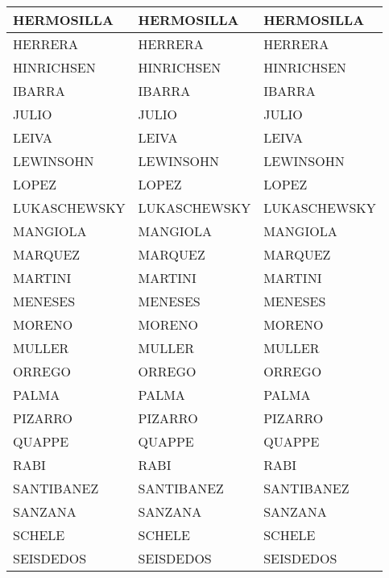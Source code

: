 \begin{table}[h]
\begin{tabular}{|l|l|l|}
HERMOSILLA           &HERMOSILLA          &HERMOSILLA          \\ \hline
HERRERA              &HERRERA             &HERRERA             \\ \hline
HINRICHSEN           &HINRICHSEN          &HINRICHSEN          \\ \hline
IBARRA               &IBARRA              &IBARRA              \\ \hline
JULIO                &JULIO               &JULIO               \\ \hline
LEIVA                &LEIVA               &LEIVA               \\ \hline
LEWINSOHN            &LEWINSOHN           &LEWINSOHN           \\ \hline
LOPEZ                &LOPEZ               &LOPEZ               \\ \hline
LUKASCHEWSKY         &LUKASCHEWSKY        &LUKASCHEWSKY        \\ \hline
MANGIOLA             &MANGIOLA            &MANGIOLA            \\ \hline
MARQUEZ              &MARQUEZ             &MARQUEZ             \\ \hline
MARTINI              &MARTINI             &MARTINI             \\ \hline
MENESES              &MENESES             &MENESES             \\ \hline
MORENO               &MORENO              &MORENO              \\ \hline
MULLER               &MULLER              &MULLER              \\ \hline
ORREGO               &ORREGO              &ORREGO              \\ \hline
PALMA                &PALMA               &PALMA               \\ \hline
PIZARRO              &PIZARRO             &PIZARRO             \\ \hline
QUAPPE               &QUAPPE              &QUAPPE              \\ \hline
RABI                 &RABI                &RABI                \\ \hline
SANTIBANEZ           &SANTIBANEZ          &SANTIBANEZ          \\ \hline
SANZANA              &SANZANA             &SANZANA             \\ \hline
SCHELE               &SCHELE              &SCHELE              \\ \hline
SEISDEDOS            &SEISDEDOS           &SEISDEDOS           \\ \hline

\end{tabular}
\end{table}
